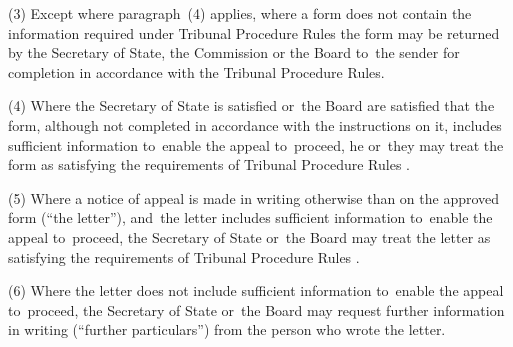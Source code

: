 \documentclass[12pt,a4paper]{article}
\begin{document}
%

(3) Except where paragraph~(4) applies, where a form does not contain the information required under Tribunal Procedure Rules the form may be returned by the Secretary of State, the Commission or the Board to~the sender for completion in accordance with the Tribunal Procedure Rules.

(4) Where the Secretary of State is satisfied 
or~the Board are satisfied   %
that the form, although not completed in accordance with the instructions on it, includes sufficient information to~enable the appeal 
to~proceed, he 
or~they   %
may treat the form as satisfying the requirements of 
Tribunal Procedure Rules%
.

(5) Where 
a notice of appeal  %
is made in writing otherwise than on the approved form (“the letter”), and~the letter includes sufficient information to~enable the appeal 
to~proceed, the Secretary of State 
or~the Board   %
may treat the letter as satisfying the requirements of 
Tribunal Procedure Rules%
.

(6) Where the letter does not include sufficient information to~enable the appeal %
to~proceed, the Secretary of State 
or~the Board   %
may request further information in writing (“further particulars”) from the person who wrote the letter.
\end{document}
